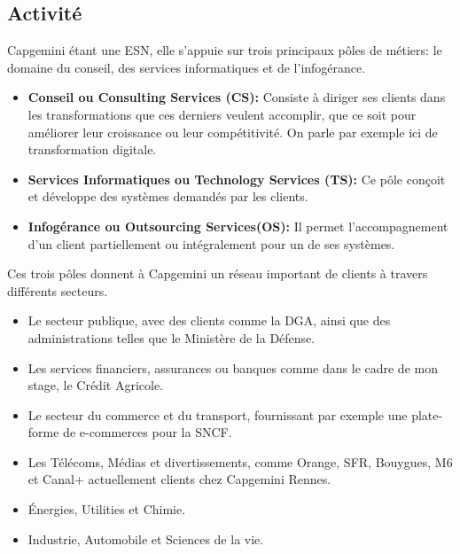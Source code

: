 \documentclass{rapport}
\begin{document}
\subsection{Activité}

Capgemini étant une ESN, elle s'appuie sur trois principaux pôles de métiers: le domaine du conseil, des services informatiques et de l'infogérance.
\begin{itemize}
  \item \textbf{Conseil ou Consulting Services (CS):} Consiste à diriger ses clients dans les transformations que ces derniers veulent accomplir, que ce soit pour améliorer leur croissance ou leur compétitivité. On parle par exemple ici de transformation digitale.
  
  \item \textbf{Services Informatiques ou Technology Services (TS):} Ce pôle conçoit et développe des systèmes demandés par les clients.
  
  \item \textbf{Infogérance ou Outsourcing Services(OS):} Il permet l'accompagnement d'un client partiellement ou intégralement pour un de ses systèmes. 
\end{itemize}
\vspace{5mm}
Ces trois pôles donnent à Capgemini un réseau important de clients à travers différents secteurs.

\begin{itemize}
  \item Le secteur publique, avec des clients comme la DGA, ainsi que des administrations telles que le Ministère de la Défense.
  
  \item Les services financiers, assurances ou banques comme dans le cadre de mon stage, le Crédit Agricole.
  
  \item Le secteur du commerce et du transport, fournissant par exemple une plate-forme de e-commerces pour la SNCF.
  
  \item Les Télécoms, Médias et divertissements, comme  Orange, SFR, Bouygues, M6 et Canal+ actuellement clients chez Capgemini Rennes.
  
  \item Énergies, Utilities et Chimie.
  
  \item Industrie, Automobile et Sciences de la vie.
\end{itemize}
\end{document}
